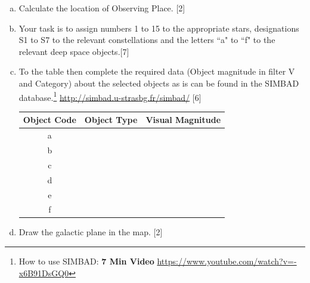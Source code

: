 \documentclass[a4paper,12pt]{extarticle}
\begin{document}
\begin{enumerate}[a.]
	\item Calculate the location of Observing Place. \hfill[2]
	\item Your task is to assign numbers 1 to 15 to the appropriate stars, designations S1 to S7 to the relevant constellations and the letters ``a" to ``f" to the relevant deep space objects.\hfill[7]
	\item To the table then complete the required data (Object magnitude in filter V and Category) about the selected objects as is can be found in the SIMBAD database.\footnote{How to use SIMBAD: \textbf{7 Min Video} \url{https://www.youtube.com/watch?v=-x6B91DsGQ0}} \url{http://simbad.u-strasbg.fr/simbad/} \hfill[6]
	
	\begin{table}[H]
		\centering
		\begin{tabular}{|c|l|l|}
			\hline
			\multicolumn{1}{|l|}{Object Code} & Object Type & Visual Magnitude \\ \hline
			a                                 &             &                  \\
			b                                 &             &                  \\
			c                                 &             &                  \\
			d                                 &             &                  \\
			e                                 &             &                  \\
			f                                 &             &                  \\ \hline
		\end{tabular}
	\end{table}
	
	\item Draw the galactic plane in the map. \hfill[2]
\end{enumerate}
\clearpage
\end{document}
